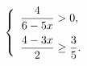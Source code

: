 \begin{ex}[type=ineq_system]
	\begin{condition}
		\( \left\{
		\begin{array}{l}
			\dfrac{4}{6-5x}>0,\vspace{2mm}\\
			\dfrac{4-3x}{2}\ge\dfrac{3}{5}.
		\end{array}
		\right. \)
	\end{condition}
\end{ex}
